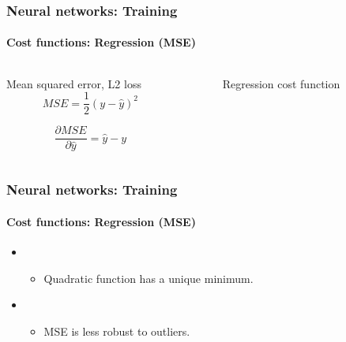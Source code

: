 \documentclass[xcolor=table]{beamer}
\begin{document}
\begin{frame}
	\frametitle{Neural networks: Training}
	\framesubtitle{Cost functions: Regression (MSE)}

\begin{columns}
	\begin{column}{.68\linewidth}
		\begin{block}{Mean squared error, L2 loss}
			\[MSE = \frac{1}{2} (y - \hat{y})^2\]
			
			\[
			\frac{\partial MSE}{\partial \hat{y}} = \hat{y} - y
			\]
		\end{block}
		
	\end{column}%
	\begin{column}{.3\linewidth}
		\begin{figure}
			\caption{Regression cost function \cite{2017-rosenberg}}
		\end{figure}
	\end{column}
\end{columns}


\end{frame}

\begin{frame}
	\frametitle{Neural networks: Training}
	\framesubtitle{Cost functions: Regression (MSE)}

\begin{itemize}
	\item {}
	\begin{itemize}
		\item Quadratic function has a unique minimum.
	\end{itemize}
	\item {}
	\begin{itemize}
		\item MSE is less robust to outliers.
	\end{itemize}
\end{itemize}

\end{frame}
\end{document}
